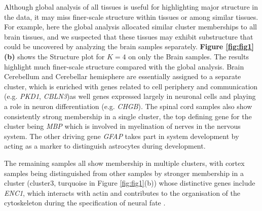 
Although global analysis of all tissues is useful for highlighting major structure in the data, it may miss finer-scale structure within tissues or among similar tissues. For example, here the global analysis allocated similar cluster memberships to all brain tissues,  and we suspected that these tissues may exhibit substructure that could be uncovered by analyzing the brain samples separately.  \textbf{Figure \ref{fig:fig1}(b)} shows the Structure plot for $K=4$ on only the Brain samples. The results highlight much finer-scale structure compared with the global analysis. Brain Cerebellum and Cerebellar hemisphere are essentially assigned to a separate cluster, which is enriched with genes related to cell periphery and communication (e.g. \textit{PKD1}, \textit{CBLN3})as well genes expressed largely in neuronal cells and playing a role in neuron differentiation (e.g. \textit{CHGB}). The spinal cord samples also show consistently strong membership in a single cluster, the top defining gene for the cluster being \textit{MBP} which is involved in myelination of nerves in the nervous system\cite{Hu2016}.  The other driving gene \textit{GFAP} takes part in system development by acting as a marker to distinguish astrocytes during development. 



The remaining samples all show membership in multiple clusters, with cortex samples being distinguished from other samples by stronger membership in a cluster (cluster3, turquoise in Figure \ref{fig:fig1}(b)) whose distinctive genes include \textit{ENC1}, which  interacts with actin and contributes to the organisation of the cytoskeleton during the specification of neural fate \cite{Hernandez1997}.



